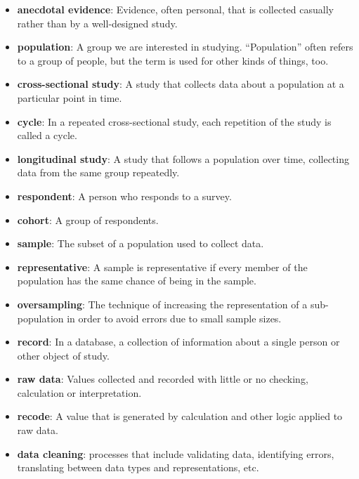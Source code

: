 \documentclass[12pt]{book}
\begin{document}
\begin{itemize}

\item {\bf anecdotal evidence}: Evidence, often personal, that is collected
  casually rather than by a well-designed study.

\item {\bf population}: A group we are interested in studying.
  ``Population'' often refers to a
  group of people, but the term is used for other kinds of things,
  too.

\item {\bf cross-sectional study}: A study that collects data about a
population at a particular point in time.

\item {\bf cycle}: In a repeated cross-sectional study, each repetition
of the study is called a cycle.

\item {\bf longitudinal study}: A study that follows a population over
time, collecting data from the same group repeatedly.

\item {\bf respondent}: A person who responds to a survey.

\item {\bf cohort}: A group of respondents.

\item {\bf sample}: The subset of a population used to collect data.

\item {\bf representative}: A sample is representative if every member
of the population has the same chance of being in the sample.

\item {\bf oversampling}: The technique of increasing the representation
of a sub-population in order to avoid errors due to small sample
sizes.

\item {\bf record}: In a database, a collection of information about
a single person or other object of study.

\item {\bf raw data}: Values collected and recorded with little or no
checking, calculation or interpretation.

\item {\bf recode}: A value that is generated by calculation and other
logic applied to raw data.

\item {\bf data cleaning}: processes that include validating data,
  identifying errors, translating between data types and
  representations, etc.

\end{itemize}
\end{document}
